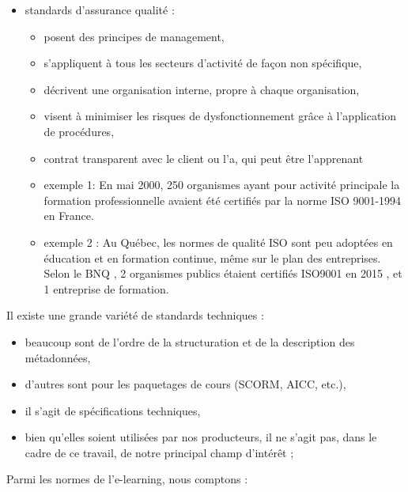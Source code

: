 \begin{frame}[allowframebreaks]
\begin{description}
\begin{itemize}
								\framebreak
								
								\item standards d'assurance qualité :
								\begin{itemize}
								\item posent des principes de management,
								\item  s’appliquent à tous les secteurs d’activité de façon non spécifique,
								\item décrivent une organisation interne, propre à chaque organisation,
								\item visent à minimiser les risques de dysfonctionnement grâce à l’application de procédures,
								\item contrat transparent avec le client ou l’a, qui peut être l’apprenant
								\item exemple 1: En mai 2000, 250 organismes ayant pour activité principale la formation professionnelle avaient été certifiés par la norme ISO 9001-1994 en France.
								\item exemple 2 :  Au Québec, les normes de qualité ISO sont peu adoptées en éducation et en formation continue, même sur le plan des entreprises. Selon le BNQ , 2 organismes publics étaient certifiés ISO9001 en 2015 , et 1 entreprise de formation.
								\end{itemize}
								   
							\end{itemize}
						
						\framebreak
						
						\item[Technologiques] Il existe une grande variété de standards techniques :  
							\begin{itemize}
							\item beaucoup sont de l’ordre de la structuration et de la description des métadonnées, 
							\item d’autres sont pour les paquetages de cours (SCORM, AICC, etc.),
							\item il s’agit de spécifications techniques, 
							\item bien qu’elles soient utilisées par nos producteurs, il ne s’agit pas, dans le cadre de ce travail, de notre principal champ d’intérêt ;
							\end{itemize}
						
						\framebreak
						
						\item[Dédiés] Parmi les normes de l'e-learning, nous comptons :
							\begin{itemize}
							

\end{itemize}
\end{description}
\end{frame}
